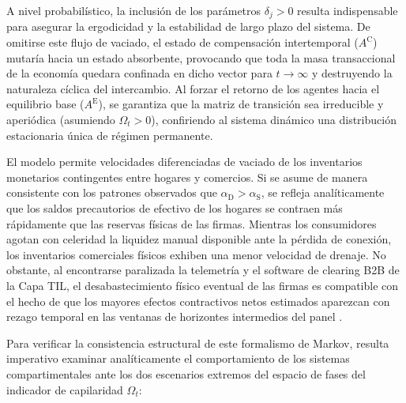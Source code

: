 A nivel probabil\'istico, la inclusi\'on de los par\'ametros $\delta_j > 0$ resulta indispensable para asegurar la ergodicidad y la estabilidad de largo plazo del sistema. De omitirse este flujo de vaciado, el estado de compensaci\'on intertemporal ($A^{\text{C}}$) mutar\'ia hacia un estado absorbente, provocando que toda la masa transaccional de la econom\'ia quedara confinada en dicho vector para $t \to \infty$ y destruyendo la naturaleza c\'iclica del intercambio. Al forzar el retorno de los agentes hacia el equilibrio base ($A^{\text{E}}$), se garantiza que la matriz de transici\'on sea irreducible y aperi\'odica (asumiendo $\Omega_t > 0$), confiriendo al sistema din\'amico una distribuci\'on estacionaria \'unica de r\'egimen permanente.

El modelo permite velocidades diferenciadas de vaciado de los inventarios monetarios contingentes entre hogares y comercios. Si se asume de manera consistente con los patrones observados que $\alpha_{\text{D}} > \alpha_{\text{S}}$, se refleja anal\'iticamente que los saldos precautorios de efectivo de los hogares se contraen m\'as r\'apidamente que las reservas f\'isicas de las firmas. Mientras los consumidores agotan con celeridad la liquidez manual disponible ante la p\'erdida de conexi\'on, los inventarios comerciales f\'isicos exhiben una menor velocidad de drenaje. No obstante, al encontrarse paralizada la telemetr\'ia y el software de clearing B2B de la Capa TIL, el desabastecimiento f\'isico eventual de las firmas es compatible con el hecho de que los mayores efectos contractivos netos estimados aparezcan con rezago temporal en las ventanas de horizontes intermedios del panel \citep{carvalho2021supply}.

Para verificar la consistencia estructural de este formalismo de Markov, resulta imperativo examinar anal\'iticamente el comportamiento de los sistemas compartimentales ante los dos escenarios extremos del espacio de fases del indicador de capilaridad $\Omega_t$:

